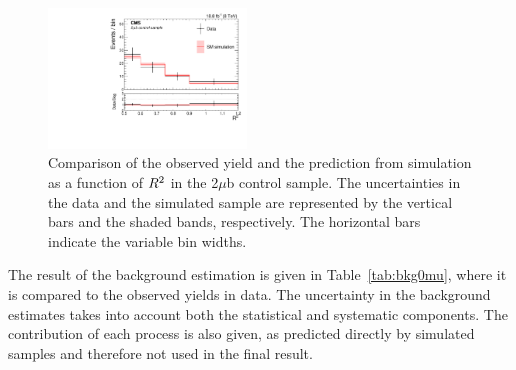 \begin{figure}
  \centering
   \includegraphics[width=0.47\textwidth]{BtagPlots/MC_CP_2Mu1TbTT_Sep.pdf}
   \caption{Comparison of the observed yield and the prediction from
     simulation as a function of $R^2$ in the 2$\mu$b control
     sample. The uncertainties in the data and the simulated
     sample are represented by the vertical bars and the shaded bands,
     respectively. The horizontal bars indicate
the variable bin widths.\label{fig:2mub}}
\end{figure}
The result of the background estimation is given in
Table~\ref{tab:bkg0mu}, where it is compared to the observed yields in
data. The uncertainty in the background estimates takes into account
both the statistical and systematic components. The contribution of each process is also given,
as predicted directly by simulated samples and therefore not used in
the final result.
\begin{table}
\centering
{}
\end{table}
